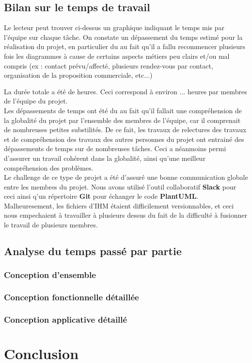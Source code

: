 \subsection{Bilan sur le temps de travail}
  \begin{figure}[H]
    
  \end{figure}
  
Le lecteur peut trouver ci-dessus un graphique indiquant le temps mis par l'équipe sur chaque tâche.
On constate un dépassement du temps estimé pour la réalisation du projet, en particulier du au fait qu'il a fallu recommencer plusieurs fois les diagrammes à cause de certains aspects métiers peu clairs et/ou mal compris (ex : contact prévu/affecté, plusieurs rendez-vous par contact, organisation de la proposition commerciale, etc...)


La durée totale a été de  heures. Ceci correspond à environ ... heures par membres de l'équipe du projet.\\

Les dépassements de temps ont été du au fait qu'il fallait une compréhension de la globalité du projet par l'ensemble des membres de l'équipe, car il comprenait de nombreuses petites substilités. De ce fait, les travaux de relectures des travaux et de compréhension des travaux des autres personnes du projet ont entrainé des dépassements de temps sur de nombreuses tâches. Ceci a néanmoins permi d'assurer un travail cohérent dans la globalité, ainsi qu'une meilleur compréhension des problèmes.\\

Le challenge de ce type de projet a été d'assuré une bonne communication globale entre les membres du projet. Nous avons utilisé l'outil collaboratif \textbf{Slack} pour ceci ainsi q'un répertoire \textbf{Git} pour échanger le code \textbf{PlantUML}. Malheuresement, les fichiers d'IHM étaient difficilement versionnables, et ceci nous empechaient à travailler à plusieurs dessus du fait de la difficulté à fusionner le travail de plusieurs membres.

\subsection{Analyse du temps passé par partie}
\subsubsection{Conception d'ensemble}
\subsubsection{Conception fonctionnelle détaillée}
\subsubsection{Conception applicative détaillé}



\section{Conclusion}
\restoregeometry